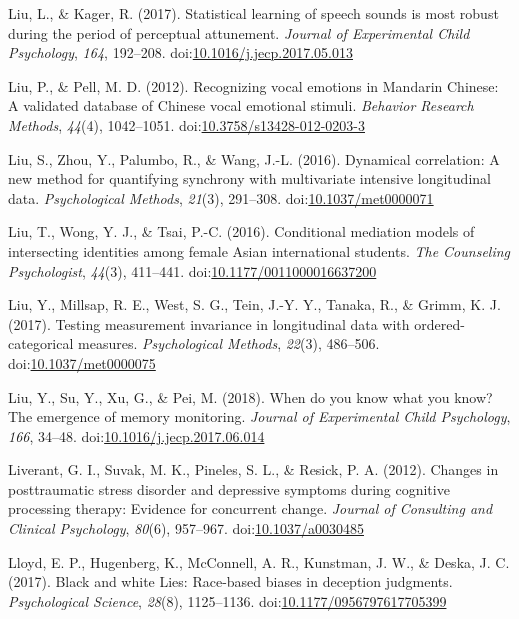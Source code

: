 \documentclass[english,man]{apa6}
\theoremstyle{definition}
\theoremstyle{definition}
\theoremstyle{definition}
\theoremstyle{remark}
\begin{document}
\hypertarget{ref-Liu2017}{}
Liu, L., \& Kager, R. (2017). Statistical learning of speech sounds is
most robust during the period of perceptual attunement. \emph{Journal of
Experimental Child Psychology}, \emph{164}, 192--208.
doi:\href{https://doi.org/10.1016/j.jecp.2017.05.013}{10.1016/j.jecp.2017.05.013}

\hypertarget{ref-Liu2012}{}
Liu, P., \& Pell, M. D. (2012). Recognizing vocal emotions in Mandarin
Chinese: A validated database of Chinese vocal emotional stimuli.
\emph{Behavior Research Methods}, \emph{44}(4), 1042--1051.
doi:\href{https://doi.org/10.3758/s13428-012-0203-3}{10.3758/s13428-012-0203-3}

\hypertarget{ref-Liu2016a}{}
Liu, S., Zhou, Y., Palumbo, R., \& Wang, J.-L. (2016). Dynamical
correlation: A new method for quantifying synchrony with multivariate
intensive longitudinal data. \emph{Psychological Methods}, \emph{21}(3),
291--308.
doi:\href{https://doi.org/10.1037/met0000071}{10.1037/met0000071}

\hypertarget{ref-Liu2016c}{}
Liu, T., Wong, Y. J., \& Tsai, P.-C. (2016). Conditional mediation
models of intersecting identities among female Asian international
students. \emph{The Counseling Psychologist}, \emph{44}(3), 411--441.
doi:\href{https://doi.org/10.1177/0011000016637200}{10.1177/0011000016637200}

\hypertarget{ref-Liu2017b}{}
Liu, Y., Millsap, R. E., West, S. G., Tein, J.-Y. Y., Tanaka, R., \&
Grimm, K. J. (2017). Testing measurement invariance in longitudinal data
with ordered-categorical measures. \emph{Psychological Methods},
\emph{22}(3), 486--506.
doi:\href{https://doi.org/10.1037/met0000075}{10.1037/met0000075}

\hypertarget{ref-Liu2018}{}
Liu, Y., Su, Y., Xu, G., \& Pei, M. (2018). When do you know what you
know? The emergence of memory monitoring. \emph{Journal of Experimental
Child Psychology}, \emph{166}, 34--48.
doi:\href{https://doi.org/10.1016/j.jecp.2017.06.014}{10.1016/j.jecp.2017.06.014}

\hypertarget{ref-Liverant2012}{}
Liverant, G. I., Suvak, M. K., Pineles, S. L., \& Resick, P. A. (2012).
Changes in posttraumatic stress disorder and depressive symptoms during
cognitive processing therapy: Evidence for concurrent change.
\emph{Journal of Consulting and Clinical Psychology}, \emph{80}(6),
957--967. doi:\href{https://doi.org/10.1037/a0030485}{10.1037/a0030485}

\hypertarget{ref-Lloyd2017}{}
Lloyd, E. P., Hugenberg, K., McConnell, A. R., Kunstman, J. W., \&
Deska, J. C. (2017). Black and white Lies: Race-based biases in
deception judgments. \emph{Psychological Science}, \emph{28}(8),
1125--1136.
doi:\href{https://doi.org/10.1177/0956797617705399}{10.1177/0956797617705399}
\end{document}

